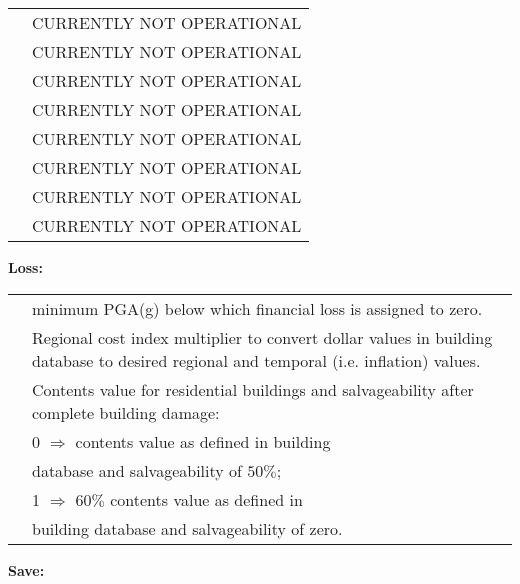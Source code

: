 \documentclass[a4paper, 12pt]{report}
\begin{document}
\begin{supertabular}{lp{0.6\textwidth}}
 & \small{CURRENTLY NOT OPERATIONAL}   \\
  &   \small{CURRENTLY NOT OPERATIONAL} \\
  &   \small{CURRENTLY NOT OPERATIONAL} \\
   &  \small{CURRENTLY NOT OPERATIONAL} \\
 &  \small{CURRENTLY NOT OPERATIONAL} \\
 &   \small{CURRENTLY NOT OPERATIONAL}  \\
   &  \small{CURRENTLY NOT OPERATIONAL} \\
   &  \small{CURRENTLY NOT OPERATIONAL} \\
 \end{supertabular}

\vspace{2em} \noindent \textbf{Loss:}

\begin{supertabular}{lp{0.6\textwidth}}
    &  minimum PGA(g) below which financial loss is assigned to zero. \\
  & Regional cost index multiplier to convert dollar values in building database to desired regional and temporal (i.e. inflation) values.\\
   &  Contents value for residential buildings and salvageability after complete building damage:   \\
& \hspace{0.5em} 0 $\Rightarrow$ contents value as defined in building \\
& \hspace{2.8em} database and salvageability of $50\%$;\\
& \hspace{0.5em} 1 $\Rightarrow$ $60\%$ contents value as defined in \\
& \hspace{2.8em} building database and salvageability of zero.\\
 \end{supertabular}

\vspace{2em} \noindent \textbf{Save:}
\end{document}
